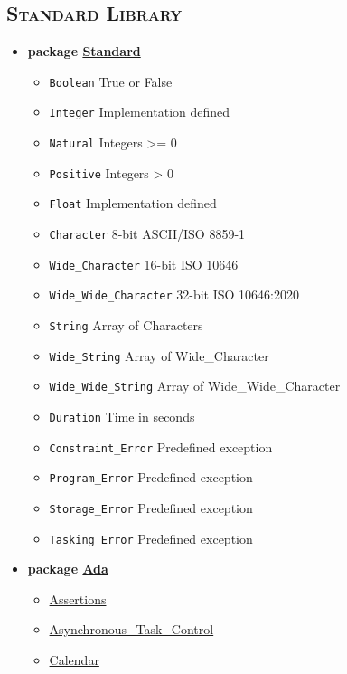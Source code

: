 \begin{scriptsize}
\begin{multicols*}{\columnnr}
\section*{\textsc{Standard Library}}
\begin{itemize}[leftmargin=0mm]
\item[] \textbf{package \href{http://www.ada-auth.org/standards/22rm/html/RM-A-1.html}{Standard}}
  \begin{itemize}[leftmargin=5mm]
  \item[] \texttt{Boolean} True or False
  \item[] \texttt{Integer} Implementation defined
  \item[] \texttt{Natural} Integers >= 0
  \item[] \texttt{Positive} Integers > 0
  \item[] \texttt{Float} Implementation defined
  \item[] \texttt{Character} 8-bit ASCII/ISO 8859-1
  \item[] \texttt{Wide\_Character} 16-bit ISO 10646
  \item[] \texttt{Wide\_Wide\_Character} 32-bit ISO 10646:2020
  \item[] \texttt{String} Array of Characters
  \item[] \texttt{Wide\_String} Array of Wide\_Character
  \item[] \texttt{Wide\_Wide\_String} Array of Wide\_Wide\_Character
  \item[] \texttt{Duration} Time in seconds
  \item[] \texttt{Constraint\_Error} Predefined exception
  \item[] \texttt{Program\_Error} Predefined exception
  \item[] \texttt{Storage\_Error} Predefined exception
  \item[] \texttt{Tasking\_Error} Predefined exception
  \end{itemize}
\item[] \textbf{package \href{http://www.ada-auth.org/standards/22rm/html/RM-A-2.html}{Ada}}
  \begin{itemize}[leftmargin=5mm]
  \item[] \href{http://www.ada-auth.org/standards/22rm/html/RM-11-4-2.html}{Assertions}
  \item[] \href{http://www.ada-auth.org/standards/22rm/html/RM-D-11.html}{Asynchronous\_Task\_Control}
  \item[] \href{http://www.ada-auth.org/standards/22rm/html/RM-9-6.html}{Calendar}

\end{itemize}
\end{itemize}
\end{multicols*}
\end{scriptsize}
